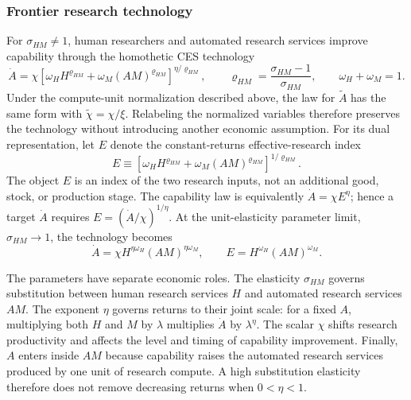 \subsubsection{Frontier research technology}

For \(\sigma_{HM}\neq1\), human researchers and automated research services
improve capability through the homothetic CES technology
\begin{equation}
 \dot A=\chi
 \left[\omega_H H^{\varrho_{HM}}
 +\omega_M(AM)^{\varrho_{HM}}\right]^{\eta/\varrho_{HM}},
 \qquad
 \varrho_{HM}=\frac{\sigma_{HM}-1}{\sigma_{HM}},
 \qquad \omega_H+\omega_M=1.
 \label{eq:axm-capability-law}
\end{equation}
Under the compute-unit normalization described above, the law for
\(\widetilde A\) has the same form with
\(\widetilde\chi=\chi/\xi\). Relabeling the normalized variables therefore
preserves the technology without introducing another economic assumption.
For its dual representation, let \(E\) denote the constant-returns
effective-research index
\begin{equation}
 E\equiv\left[\omega_H H^{\varrho_{HM}}
 +\omega_M(AM)^{\varrho_{HM}}\right]^{1/\varrho_{HM}}.
 \label{eq:axm-effective-research}
\end{equation}
The object \(E\) is an index of the two research inputs, not an additional good,
stock, or production stage. The capability law is equivalently
\(\dot A=\chi E^\eta\); hence a target \(\dot A\) requires
\(E=(\dot A/\chi)^{1/\eta}\). At the unit-elasticity parameter limit,
\(\sigma_{HM}\to1\), the technology becomes
\begin{equation}
 \dot A=\chi H^{\eta\omega_H}(AM)^{\eta\omega_M},
 \qquad E=H^{\omega_H}(AM)^{\omega_M}.
 \label{eq:axm-capability-law-cd}
\end{equation}

The parameters have separate economic roles. The elasticity \(\sigma_{HM}\)
governs substitution between human research services \(H\) and automated
research services \(AM\). The exponent \(\eta\) governs returns to their joint
scale: for a fixed \(A\), multiplying both \(H\) and \(M\) by \(\lambda\)
multiplies \(\dot A\) by \(\lambda^\eta\). The scalar \(\chi\) shifts research
productivity and affects the level and timing of capability improvement.
Finally, \(A\) enters inside \(AM\) because capability raises the automated
research services produced by one unit of research compute. A high substitution
elasticity therefore does not remove decreasing returns when \(0<\eta<1\).

